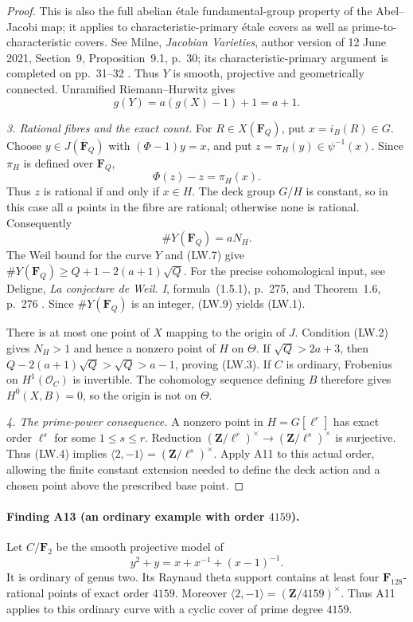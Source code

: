 \documentclass[11pt,a4paper]{article}
\begin{document}
\begin{proof}
This is also the full abelian \'etale fundamental-group property
of the Abel--Jacobi map; it applies to characteristic-primary
\'etale covers as well as prime-to-characteristic covers.
See Milne, \emph{Jacobian Varieties}, author version of
12 June 2021, Section~9, Proposition~9.1, p.~30;
its characteristic-primary argument is completed on pp.~31--32 \cite{MilneJV}.
Thus $Y$ is smooth, projective and geometrically connected.
Unramified Riemann--Hurwitz gives
\[
                         g(Y)=a(g(X)-1)+1=a+1.
 \tag{LW.7}
\]

\emph{3. Rational fibres and the exact count.}
For $R\in X(\mathbf F_Q)$, put $x=i_B(R)\in G$.
Choose $y\in J(\overline{\mathbf F}_Q)$ with
$(\Phi-1)y=x$, and put $z=\pi_H(y)\in\psi^{-1}(x)$.
Since $\pi_H$ is defined over $\mathbf F_Q$,
\[
                 \Phi(z)-z=\pi_H(x).
 \tag{LW.8}
\]
Thus $z$ is rational if and only if $x\in H$.
The deck group $G/H$ is constant, so in this case all $a$ points
in the fibre are rational; otherwise none is rational.
Consequently
\[
                           \#Y(\mathbf F_Q)=aN_H.
 \tag{LW.9}
\]
The Weil bound for the curve $Y$ and (LW.7) give
$\#Y(\mathbf F_Q)\ge Q+1-2(a+1)\sqrt Q$.
For the precise cohomological input, see Deligne,
\emph{La conjecture de Weil. I}, formula~(1.5.1), p.~275, and
Theorem~1.6, p.~276 \cite{WeilI}.  Since $\#Y(\mathbf F_Q)$ is an integer,
(LW.9) yields (LW.1).

There is at most one point of $X$ mapping to the origin of $J$.
Condition (LW.2) gives $N_H>1$ and hence a nonzero point of $H$ on
$\Theta$.  If $\sqrt Q>2a+3$, then
$Q-2(a+1)\sqrt Q>\sqrt Q>a-1$, proving (LW.3).
If $C$ is ordinary, Frobenius on $H^1(\mathcal O_C)$ is invertible.
The cohomology sequence defining $B$ therefore gives
$H^0(X,B)=0$, so the origin is not on $\Theta$.

\emph{4. The prime-power consequence.}
A nonzero point in $H=G[\ell^r]$ has exact order $\ell^s$ for some
$1\le s\le r$.  Reduction
$(\mathbf Z/\ell^r)^\times\to(\mathbf Z/\ell^s)^\times$ is surjective.
Thus (LW.4) implies
$\langle2,-1\rangle=(\mathbf Z/\ell^s)^\times$.
Apply A11 to this actual order, allowing the finite constant
extension needed to define the deck action and a chosen point
above the prescribed base point.
\end{proof}

\paragraph{Finding A13 (an ordinary example with order $4159$).}
Let $C/\mathbf F_2$ be the smooth projective model of
\[
                  y^2+y=x+x^{-1}+(x-1)^{-1}.
 \tag{LW.10}
\]
It is ordinary of genus two.  Its Raynaud theta support contains
at least four $\mathbf F_{128}$-rational points of exact order
$4159$.  Moreover
$\langle2,-1\rangle=(\mathbf Z/4159)^\times$.
Thus A11 applies to this ordinary curve with a cyclic cover of
prime degree $4159$.
\end{document}
